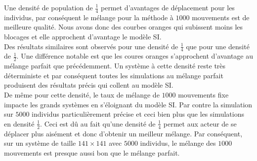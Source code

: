 Une densité de population de $\frac{1}{4}$ permet d'avantages de déplacement pour les individus, par conséquent le mélange pour la méthode à $1000$ mouvements est de meilleure qualité. Nous avons donc des courbes oranges qui subissent moins les blocages et elle approchent d'avantage le modèle SI.\\

Des résultats similaires sont observés pour une densité de $\frac{1}{4}$ que pour une densité de $\frac{1}{2}$. Une différence notable est que les coures oranges s'approchent d'avantage au mélange parfait que précédemment. Un système à cette densité reste très déterministe et par conséquent toutes les simulations au mélange parfait produisent des résultats précis qui collent au modèle SI.\\

De même pour cette densité, le taux de mélange de $1000$ mouvements fixe impacte les grands systèmes en s'éloignant du modèle SI. Par contre la simulation sur $5000$ individus particulièrement précise et ceci bien plus que les simulations en densité $\frac{1}{2}$. Ceci est dû au fait qu'une densité de $\frac{1}{4}$ permet aux acteur de se déplacer plus aisément et donc d'obtenir un meilleur mélange. Par conséquent, sur un système de taille $141\times 141$ avec $5000$ individus, le mélange des $1000$ mouvements est presque aussi bon que le mélange parfait.

\newpage

